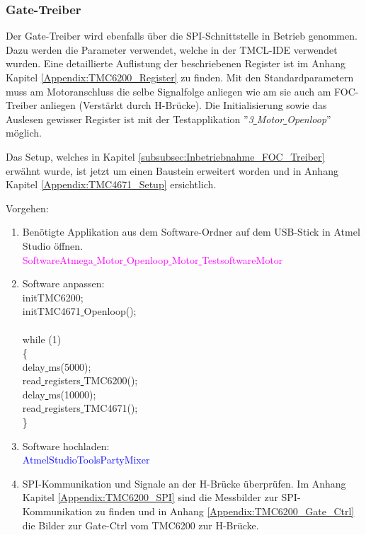 \subsubsection{Gate-Treiber}
\label{subsubsec:Inbetriebnahme_Gate_Treiber}

Der Gate-Treiber wird ebenfalls über die SPI-Schnittstelle in Betrieb genommen. Dazu werden die Parameter verwendet, welche in der TMCL-IDE verwendet wurden. Eine detaillierte Auflistung der beschriebenen Register ist im Anhang Kapitel \ref{Appendix:TMC6200_Register} zu finden. Mit den Standardparametern muss am Motoranschluss die selbe Signalfolge anliegen wie am sie auch am FOC-Treiber anliegen (Verstärkt durch H-Brücke). Die Initialisierung sowie das Auslesen gewisser Register ist mit der Testapplikation ''\textit{3\underline{ }Motor\underline{ }Openloop}'' möglich.

Das Setup, welches in Kapitel \ref{subsubsec:Inbetriebnahme_FOC_Treiber} erwähnt wurde, ist jetzt um einen Baustein erweitert worden und in Anhang Kapitel \ref{Appendix:TMC4671_Setup} ersichtlich.

Vorgehen:
\begin{enumerate}
\item Benötigte Applikation aus dem Software-Ordner auf dem USB-Stick in Atmel Studio öffnen.\\
\textcolor{magenta}{Software\textrightarrow Atmega\underline{ }Motor\underline{ }Openloop\underline{ }Motor\underline{ }Testsoftware\textrightarrow Motor}\\


\item Software anpassen:\\
\textcolor{OliveGreen}{
	initTMC6200;\\
	initTMC4671\underline{ }Openloop();\\
\\
    while (1) \\
    \{\\
		\underline{ }delay\underline{ }ms(5000);\\
		read\underline{ }registers\underline{ }TMC6200();\\
		\underline{ }delay\underline{ }ms(10000);\\
		read\underline{ }registers\underline{ }TMC4671();\\
    \}
}\newline
\item Software hochladen:\\
\textcolor{blue}{AtmelStudio\textrightarrow Tools\textrightarrow PartyMixer}\\


\item SPI-Kommunikation und Signale an der H-Brücke überprüfen. Im Anhang Kapitel \ref{Appendix:TMC6200_SPI} sind die Messbilder zur SPI-Kommunikation zu finden und in Anhang \ref{Appendix:TMC6200_Gate_Ctrl} die Bilder zur Gate-Ctrl vom TMC6200 zur H-Brücke.

\end{enumerate}